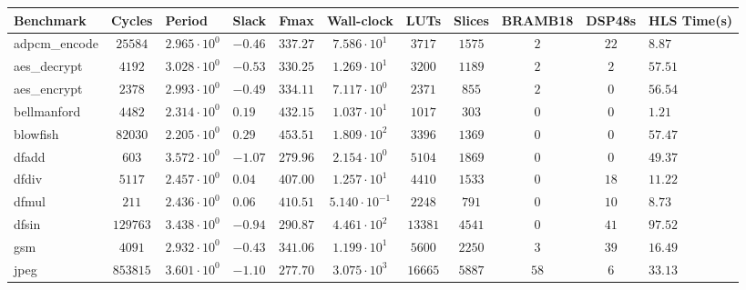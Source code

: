 \begin{tabular}{|l|c|HHc|c|c|c|c|cH|}
\hline
Benchmark     & Cycles       & Period                 & Slack     & Fmax       & Wall-clock              & LUTs      & Slices    & BRAMB18 & DSP48s  & HLS Time(s) \\
\hline
adpcm\_encode & $ 25584    $ & $ 2.965 \cdot 10^{0} $ & $ -0.46 $ & $ 337.27 $ & $ 7.586 \cdot 10^{1}  $ & $ 3717  $ & $ 1575  $ & $ 2   $ & $ 22  $ & $ 8.87    $ \\
aes\_decrypt  & $ 4192     $ & $ 3.028 \cdot 10^{0} $ & $ -0.53 $ & $ 330.25 $ & $ 1.269 \cdot 10^{1}  $ & $ 3200  $ & $ 1189  $ & $ 2   $ & $ 2   $ & $ 57.51   $ \\
aes\_encrypt  & $ 2378     $ & $ 2.993 \cdot 10^{0} $ & $ -0.49 $ & $ 334.11 $ & $ 7.117 \cdot 10^{0}  $ & $ 2371  $ & $ 855   $ & $ 2   $ & $ 0   $ & $ 56.54   $ \\
bellmanford   & $ 4482     $ & $ 2.314 \cdot 10^{0} $ & $ 0.19  $ & $ 432.15 $ & $ 1.037 \cdot 10^{1}  $ & $ 1017  $ & $ 303   $ & $ 0   $ & $ 0   $ & $ 1.21    $ \\
blowfish      & $ 82030    $ & $ 2.205 \cdot 10^{0} $ & $ 0.29  $ & $ 453.51 $ & $ 1.809 \cdot 10^{2}  $ & $ 3396  $ & $ 1369  $ & $ 0   $ & $ 0   $ & $ 57.47   $ \\
dfadd         & $ 603      $ & $ 3.572 \cdot 10^{0} $ & $ -1.07 $ & $ 279.96 $ & $ 2.154 \cdot 10^{0}  $ & $ 5104  $ & $ 1869  $ & $ 0   $ & $ 0   $ & $ 49.37   $ \\
dfdiv         & $ 5117     $ & $ 2.457 \cdot 10^{0} $ & $ 0.04  $ & $ 407.00 $ & $ 1.257 \cdot 10^{1}  $ & $ 4410  $ & $ 1533  $ & $ 0   $ & $ 18  $ & $ 11.22   $ \\
dfmul         & $ 211      $ & $ 2.436 \cdot 10^{0} $ & $ 0.06  $ & $ 410.51 $ & $ 5.140 \cdot 10^{-1} $ & $ 2248  $ & $ 791   $ & $ 0   $ & $ 10  $ & $ 8.73    $ \\
dfsin         & $ 129763   $ & $ 3.438 \cdot 10^{0} $ & $ -0.94 $ & $ 290.87 $ & $ 4.461 \cdot 10^{2}  $ & $ 13381 $ & $ 4541  $ & $ 0   $ & $ 41  $ & $ 97.52   $ \\
gsm           & $ 4091     $ & $ 2.932 \cdot 10^{0} $ & $ -0.43 $ & $ 341.06 $ & $ 1.199 \cdot 10^{1}  $ & $ 5600  $ & $ 2250  $ & $ 3   $ & $ 39  $ & $ 16.49   $ \\
jpeg          & $ 853815   $ & $ 3.601 \cdot 10^{0} $ & $ -1.10 $ & $ 277.70 $ & $ 3.075 \cdot 10^{3}  $ & $ 16665 $ & $ 5887  $ & $ 58  $ & $ 6   $ & $ 33.13   $ \\

\end{tabular}
